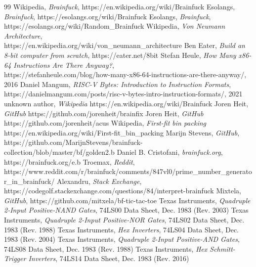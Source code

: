 \begin{thebibliography}{99} \label{resources}
 Wikipedia, \emph{Brainfuck}, https://en.wikipedia.org/wiki/Brainfuck
 Esolangs, \emph{Brainfuck}, https://esolangs.org/wiki/Brainfuck
 Esolangs, \emph{Brainfuck}, https://esolangs.org/wiki/Random\_Brainfuck
 Wikipedia, \emph{Von Neumann Architecture},\\https://en.wikipedia.org/wiki/von\_neumann\_architecture
 Ben Eater, \emph{Build an 8-bit computer from scratch}, https://eater.net/8bit
 Stefan Heule, \emph{How Many x86-64 Instructions Are There Anyway?},\\https://stefanheule.com/blog/how-many-x86-64-instructions-are-there-anyway/, 2016
 Daniel Mangum, \emph{RISC-V Bytes: Introduction to Instruction Formats},\\https://danielmangum.com/posts/risc-v-bytes-intro-instruction-formats/, 2021
 unknown author, \emph{Wikipedia} https://en.wikipedia.org/wiki/Brainfuck
 Joren Heit, \emph{GitHub} https://github.com/jorenheit/brainfix
 Joren Heit, \emph{GitHub} https://github.com/jorenheit/acus
 Wikipedia, \emph{First-fit bin packing} https://en.wikipedia.org/wiki/First-fit\_bin\_packing
 Marijn Stevens, \emph{GitHub}, \\https://github.com/MarijnStevens/brainfuck-collection/blob/master/bf/golden2.b
 Daniel B. Cristofani, \emph{brainfuck.org}, https://brainfuck.org/e.b
 Troemax, \emph{Reddit}, \\https://www.reddit.com/r/brainfuck/comments/847vl0/prime\_number\_generator\_in\_brainfuck/
 Alexandru, \emph{Stack Exchange}, \\https://codegolf.stackexchange.com/questions/84/interpret-brainfuck
 Mixtela, \emph{GitHub}, https://github.com/mitxela/bf-tic-tac-toe
 Texas Instruments, \emph{Quadruple 2-Input Positive-NAND Gates}, 74LS00 Data Sheet, Dec. 1983 (Rev. 2003)
 Texas Instruments, \emph{Quadruple 2-Input Positive-NOR Gates}, 74LS02 Data Sheet, Dec. 1983 (Rev. 1988)
 Texas Instruments, \emph{Hex Inverters}, 74LS04 Data Sheet, Dec. 1983 (Rev. 2004)
 Texas Instruments, \emph{Quadruple 2-Input Positive-AND Gates}, 74LS08 Data Sheet, Dec. 1983 (Rev. 1988)
 Texas Instruments, \emph{Hex Schmitt-Trigger Inverters}, 74LS14 Data Sheet, Dec. 1983 (Rev. 2016)

\end{thebibliography}
